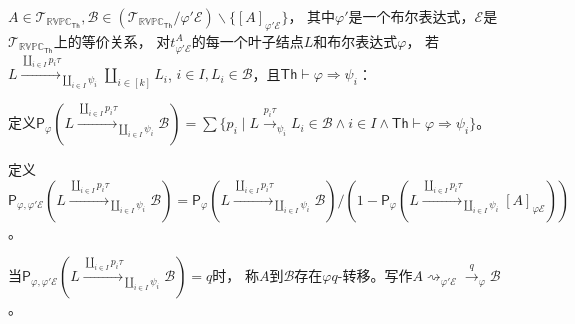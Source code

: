 \begin{definition}
   $A\in \mathcal{T}_{\mathbb{RVPC}_{\mathsf{Th}}},\mathcal{B}\in (\mathcal{T}_{\mathbb{RVPC}_{\mathsf{Th}}}/\varphi' \mathcal{E})\backslash \{[A]_{\varphi'\mathcal{E}}\}$，
   其中$\varphi'$是一个布尔表达式，$\mathcal{E}$是$\mathcal{T}_{\mathbb{RVPC}_{\mathsf{Th}}}$上的等价关系，
   对$t^A_{\varphi' \mathcal{E}}$的每一个叶子结点$L$和布尔表达式$\varphi$，
   若$L\stackrel{\coprod_{i\in I}p_i\tau}{\longrightarrow}_{\coprod_{i\in I}\psi_i} \coprod_{i\in [k]}L_i$,
$i\in I, L_i\in \mathcal{B}$，且$\mathsf{Th}\vdash \varphi \Rightarrow \psi_i$：

定义$\mathsf{P}_\varphi(L\stackrel{\coprod_{i\in I}p_i\tau}{\longrightarrow}_{\coprod_{i\in I}\psi_i}\mathcal{B}) = \sum\{p_i\mid L\stackrel{p_i\tau}{\rightarrow}_{\psi_i} L_i\in\mathcal{B} \wedge i\in I \wedge \mathsf{Th}\vdash \varphi \Rightarrow \psi_i\}$。

定义$\mathsf{P}_{\varphi, \varphi' \mathcal{E}}(L\stackrel{\coprod_{i\in I}p_i\tau}{\longrightarrow}_{\coprod_{i\in I}\psi_i}\mathcal{B}) = \mathsf{P}_\varphi(L\stackrel{\coprod_{i\in I}p_i\tau}{\longrightarrow}_{\coprod_{i\in I}\psi_i}\mathcal{B})/(1-\mathsf{P}_\varphi(L\stackrel{\coprod_{i\in I}p_i\tau}{\longrightarrow}_{\coprod_{i\in I}\psi_i}[A]_{\varphi\mathcal{E}}))$。

当$\mathsf{P}_{\varphi,\varphi' \mathcal{E}}(L\stackrel{\coprod_{i\in I}p_i\tau}{\longrightarrow}_{\coprod_{i\in I}\psi_i}\mathcal{B})=q$时，
称$A$到$\mathcal{B}$存在$\varphi q$-转移。写作$A\rightsquigarrow_{\varphi'\mathcal{E}} \stackrel{q}{\rightarrow}_{\varphi} \mathcal{B}$。
\end{definition}

